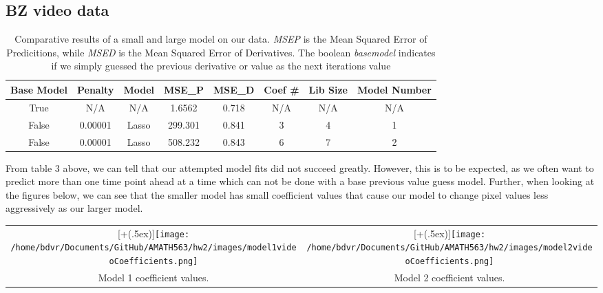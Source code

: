 \documentclass[12pt]{article}
\newcommand*{\addheight}[2][.5ex]{%
	\raisebox{0pt}[\dimexpr\height+(#1)\relax]{#2}%
}
\begin{document}
\subsection{BZ video data}
\begin{table}[H]
	\begin{center}
		\begin{tabular}{cccccccc}
			\toprule
			Base Model & Penalty & Model & MSE\_P & MSE\_D & Coef \# & Lib Size & Model Number\\
			\midrule
			True & N/A & N/A & 1.6562 &  0.718 & N/A & N/A & N/A\\
			False & 0.00001 & Lasso & 299.301 &  0.841 & 3 & 4 & 1\\
			False & 0.00001 & Lasso & 508.232 &  0.843 & 6 & 7 & 2\\
			\bottomrule
		\end{tabular}
		
		\caption{Comparative results of a small and large model on our data. \textit{MSEP} is the Mean Squared Error of Predicitions, while \textit{MSED }is the Mean Squared Error of Derivatives. The boolean \textit{basemodel} indicates if we simply guessed the previous derivative or value as the next iterations value}
	\end{center}
\end{table}
\vspace*{-\baselineskip}
	From table 3 above, we can tell that our attempted model fits did not succeed greatly. However, this is to be expected, as we often want to predict more than one time point ahead at a time which can not be done with a base previous value guess model. Further, when looking at the figures below, we can see that the smaller model has small coefficient values that cause our model to change pixel values less aggressively as our larger model.
	
	\begin{table}[H]
		\begin{center}
			\begin{tabular*}{.68\linewidth}{|c|c|}
				\hline
				\addheight{\texttt{[image: /home/bdvr/Documents/GitHub/AMATH563/hw2/images/model1videoCoefficients.png]}} 
				&
				\addheight{\texttt{[image: /home/bdvr/Documents/GitHub/AMATH563/hw2/images/model2videoCoefficients.png]}}\\
				\small Model 1 coefficient values. &  			
				\small Model 2 coefficient values. \\
				\hline
			\end{tabular*}
		\end{center}
	\end{table}
\end{document}
